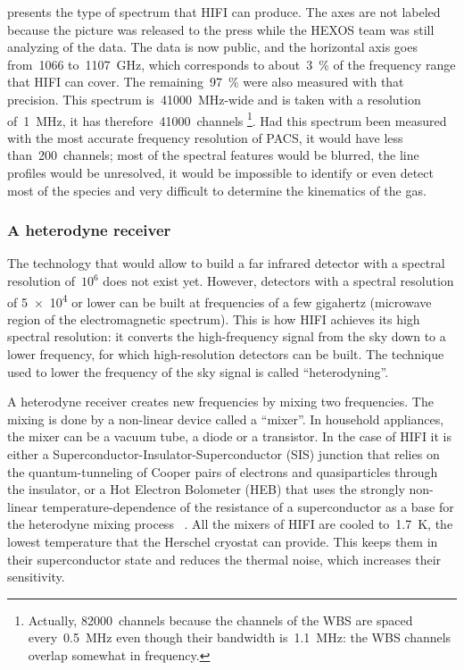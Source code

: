  presents the type of spectrum that HIFI can produce.
The axes are not labeled because the picture was released to the press
while the HEXOS team was still analyzing of the data.
The data is now public, and the horizontal axis goes from~\num{1066} to~\SI{1107}{\giga\hertz}, which corresponds to about~\SI{3}{\percent} of the frequency range that HIFI can cover.
The remaining~\SI{97}{\percent} were also measured with that precision.
This spectrum is~\SI{41000}{\mega\hertz}-wide and is taken with a resolution of~\SI{1}{\mega\hertz}, it has therefore~\num{41000}~channels%
\footnote{Actually, \num{82000}~channels because the channels of the WBS are spaced every~\SI{0.5}{\mega\hertz} even though their bandwidth is~\SI{1.1}{\mega\hertz}: the WBS channels overlap somewhat in frequency.}.
Had this spectrum been measured with the most accurate frequency resolution of PACS, it would have less than~\num{200}~channels; most of the spectral features would be blurred, the line profiles would be unresolved, it would be impossible to identify or even detect most of the species and very difficult to determine the kinematics of the gas.





\subsubsection{A heterodyne receiver}

The technology that would allow to build a far infrared detector with a spectral resolution of~$10^6$ does not exist yet.
However, detectors with a spectral resolution of \num{5e4} or lower can be built at frequencies of a few gigahertz (microwave region of the electromagnetic spectrum).
This is how HIFI achieves its high spectral resolution: it converts the high-frequency signal from the sky down to a lower frequency, for which high-resolution detectors can be built.
The technique used to lower the frequency of the sky signal is called ``heterodyning''.

A heterodyne receiver creates new frequencies by mixing two frequencies.
The mixing is done by a non-linear device called a ``mixer''.
In household appliances, the mixer can be a vacuum tube, a diode or a transistor.
In the case of HIFI it is either
a Superconductor-Insulator-Superconductor (SIS) junction that relies on the quantum-tunneling of Cooper pairs of electrons and quasiparticles through the insulator,
or a Hot Electron Bolometer (HEB) that uses the strongly non-linear temperature-dependence of the resistance of a superconductor as a base for the heterodyne mixing process%
~\cite{kooi2008}.
All the mixers of HIFI are cooled to~\SI{1.7}{\kelvin}, the lowest temperature that the Herschel cryostat can provide.
This keeps them in their superconductor state and reduces the thermal noise, which increases their sensitivity.


